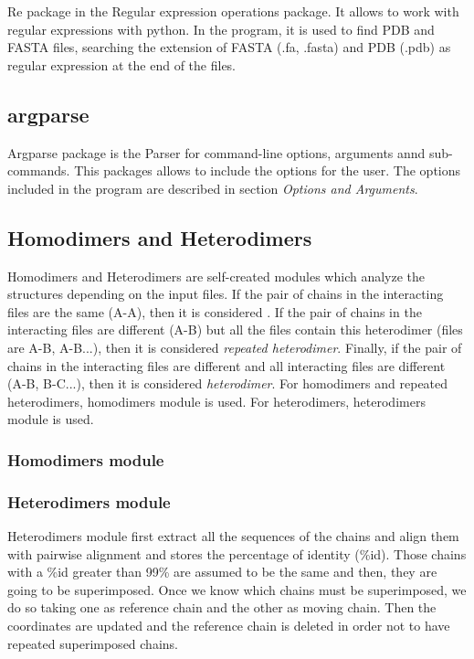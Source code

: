 \documentclass[a4paper,12pt]{report}
\begin{document}
Re package in the Regular expression operations package. It allows to work with regular expressions with python. In the program, it is used to find PDB and FASTA files, searching the extension of FASTA (.fa, .fasta) and PDB (.pdb) as regular expression at the end of the files.


\subsection{argparse}

Argparse package is the Parser for command-line options, arguments annd sub-commands. This packages allows to include the options for the user. The options included in the program are described in section \textit{Options and Arguments}.

\subsection{Homodimers and Heterodimers}

Homodimers and Heterodimers are self-created modules which analyze the structures depending on the input files. If the pair of chains in the interacting files are the same (A-A), then it is considered . If the pair of chains in the interacting files are different (A-B) but all the files contain this heterodimer (files are A-B, A-B...), then it is considered \textit{repeated heterodimer}. Finally, if the pair of chains in the interacting files are different and all interacting files are different (A-B, B-C...), then it is considered \textit{heterodimer}. For homodimers and repeated heterodimers, homodimers module is used. For heterodimers, heterodimers module is used.

\subsubsection{Homodimers module}

\subsubsection{Heterodimers module}

Heterodimers module first extract all the sequences of the chains and align them with pairwise alignment and stores the percentage of identity (\%id). Those chains with a \%id greater than 99\% are assumed to be the same and then, they are going to be superimposed. 
Once we know which chains must be superimposed, we do so taking one as reference chain and the other as moving chain. Then the coordinates are updated and the reference chain is deleted in order not to have repeated superimposed chains. 
\end{document}
